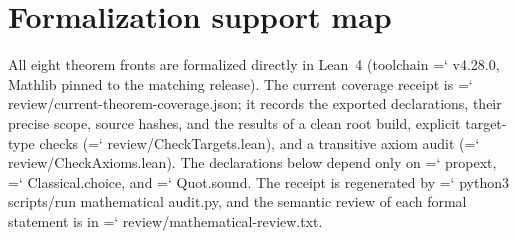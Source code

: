 \documentclass[11pt]{article}
\renewcommand{\texttt}[1]{{\ttfamily\hyphenchar\font=`\-\relax
   \def\_{\textunderscore\penalty50 }\def\/{\char`\/\penalty50 }#1}}
\begin{document}
  \section{Formalization support map}
All eight theorem fronts are formalized directly in Lean~4 (toolchain \texttt{v4.28.0}, Mathlib pinned to the matching release).
The current coverage receipt is \texttt{review/current-theorem-coverage.json}; it records the exported declarations, their precise scope, source hashes, and the results of a clean root build, explicit target-type checks (\texttt{review/CheckTargets.lean}), and a transitive axiom audit (\texttt{review/CheckAxioms.lean}).
The declarations below depend only on \texttt{propext}, \texttt{Classical.choice}, and \texttt{Quot.sound}.
The receipt is regenerated by \texttt{python3 scripts/run\_mathematical\_audit.py}, and the semantic review of each formal statement is in \texttt{review/mathematical-review.txt}.
\end{document}

